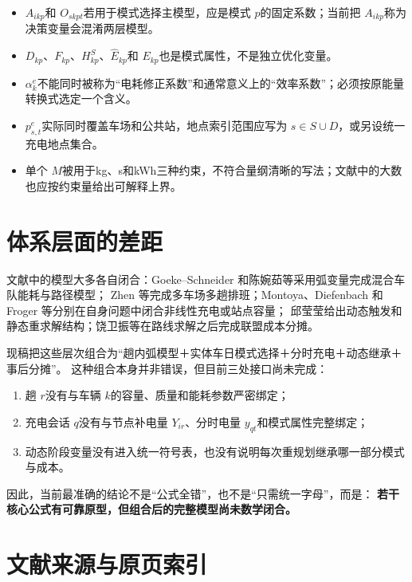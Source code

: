 \documentclass[UTF8,11pt,a4paper,fontset=none]{ctexart}
\begin{document}
\begin{itemize}
  \item $A_{ikp}$和 $O_{skpt}$若用于模式选择主模型，应是模式 $p$的固定系数；当前把 $A_{ikp}$称为决策变量会混淆两层模型。
  \item $D_{kp}$、$F_{kp}$、$H_{kp}^{S}$、$\widehat E_{kp}$和 $E_{kp}$也是模式属性，不是独立优化变量。
  \item $\alpha_k^e$不能同时被称为“电耗修正系数”和通常意义上的“效率系数”；必须按原能量转换式选定一个含义。
  \item $p_{s,t}^{e}$实际同时覆盖车场和公共站，地点索引范围应写为 $s\in S\cup D$，或另设统一充电地点集合。
  \item 单个 $M$被用于kg、s和kWh三种约束，不符合量纲清晰的写法；文献中的大数也应按约束量给出可解释上界。
\end{itemize}

\section{体系层面的差距}

文献中的模型大多各自闭合：Goeke--Schneider 和陈婉茹等采用弧变量完成混合车队能耗与路径模型；
Zhen 等完成多车场多趟排班；Montoya、Diefenbach 和 Froger 等分别在自身问题中闭合非线性充电或站点容量；
邱莹莹给出动态触发和静态重求解结构；饶卫振等在路线求解之后完成联盟成本分摊。

现稿把这些层次组合为“趟内弧模型＋实体车日模式选择＋分时充电＋动态继承＋事后分摊”。
这种组合本身并非错误，但目前三处接口尚未完成：

\begin{enumerate}[leftmargin=2.4em]
  \item 趟 $r$没有与车辆 $k$的容量、质量和能耗参数严密绑定；
  \item 充电会话 $q$没有与节点补电量 $Y_{ir}$、分时电量 $y_{qt}$和模式属性完整绑定；
  \item 动态阶段变量没有进入统一符号表，也没有说明每次重规划继承哪一部分模式与成本。
\end{enumerate}

因此，当前最准确的结论不是“公式全错”，也不是“只需统一字母”，而是：
\textbf{若干核心公式有可靠原型，但组合后的完整模型尚未数学闭合。}

\section{文献来源与原页索引}
\end{document}
